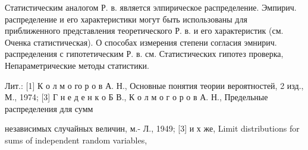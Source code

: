 \documentclass[10pt]{article}
\begin{document}
Статистическим аналогом Р. в. является элпирическое распределение. Эмпирич. распределение и его характеристики могут быть использованы для приближенного представления теоретического Р. в. и его характеристик (см. Оченка статистическая). О способах измерения степени согласия эмнирич. распределения с гипотетическим Р. в. см. Статистических гипотез проверка, Непараметрические методы статистики.



Лит.: [1] К о л м о го р о в А. Н., Основные понятия теории вероятностей, 2 изд., М., 1974; [3] Г н е д е н к о Б В., К о л м о г о р о в А. Н., Предельные распределения для сумм

независимых случайных величин, м.- Л., 1949; [3] и х же, Limit distributions for sums of independent random variables,
\end{document}
